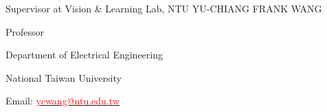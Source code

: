 

\begin{cventries}

  \cventry
    {Supervisor at Vision \& Learning Lab, NTU} %
    {YU-CHIANG FRANK WANG} %
    {} %
    {} %
    {
      \begin{cvitems} %
        \item {Professor}
        \item {Department of Electrical Engineering}
        \item {National Taiwan University}
        \item {Email: \href{ycwang@ntu.edu.tw}{\textcolor{red}{ycwang@ntu.edu.tw}}}
      \end{cvitems}
    }
\end{cventries}
